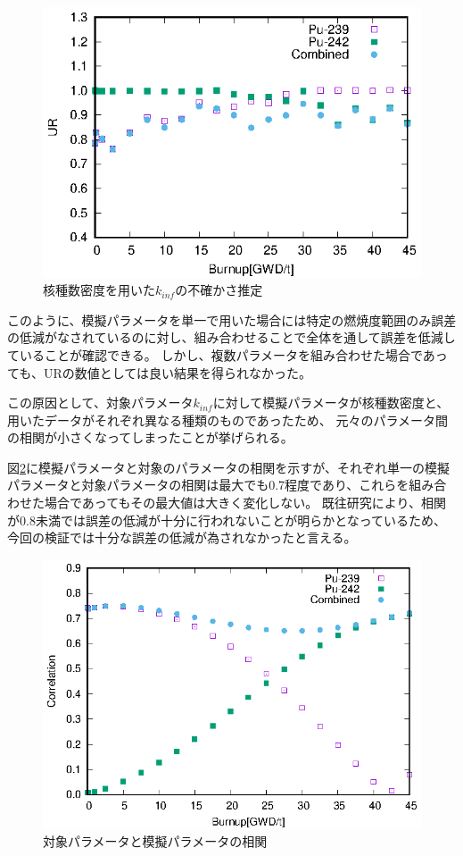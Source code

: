 \documentclass[a4paper,11pt,titlepage,uplatex]{jsreport}
\begin{document}
\begin{figure}[H]
  \centering
  \includegraphics{2mockup_data.eps}
  \caption{核種数密度を用いた$k_{inf}$の不確かさ推定}
  \label{fig:2mockup}
\end{figure}
このように、模擬パラメータを単一で用いた場合には特定の燃焼度範囲のみ誤差の低減がなされているのに対し、組み合わせることで全体を通して誤差を低減していることが確認できる。
しかし、複数パラメータを組み合わせた場合であっても、URの数値としては良い結果を得られなかった。

この原因として、対象パラメータ$k_{inf}$に対して模擬パラメータが核種数密度と、用いたデータがそれぞれ異なる種類のものであったため、
元々のパラメータ間の相関が小さくなってしまったことが挙げられる。

図\ref{fig:2mockup_corr}に模擬パラメータと対象のパラメータの相関を示すが、それぞれ単一の模擬パラメータと対象パラメータの相関は最大でも0.7程度であり、これらを組み合わせた場合であってもその最大値は大きく変化しない。
既往研究により、相関が0.8未満では誤差の低減が十分に行われないことが明らかとなっているため、今回の検証では十分な誤差の低減が為されなかったと言える。
\begin{figure}[H]
  \centering
  \includegraphics{2mockup_corr.eps}
  \caption{対象パラメータと模擬パラメータの相関}
  \label{fig:2mockup_corr}
\end{figure}
\end{document}
